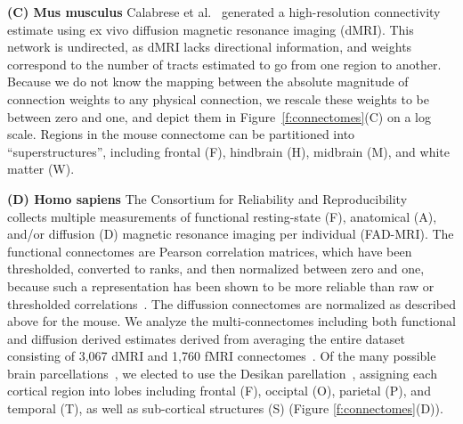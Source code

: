 \documentclass[11pt]{article}
\begin{document}
    \textbf{(C) Mus musculus}
    Calabrese et al.~\cite{Calabrese2015-gw} generated a high-resolution connectivity estimate using ex vivo diffusion magnetic resonance imaging (dMRI).  This network is undirected, as dMRI lacks directional information, and weights correspond to the number of tracts estimated to go from one region to another. Because we do not know the mapping between  the absolute magnitude of  connection weights to any  physical connection, we rescale these weights to be between zero and one, and depict them in Figure~\ref{f:connectomes}(C) on a log scale.
    Regions in the mouse  connectome can  be  partitioned into ``superstructures'', including frontal (F), hindbrain (H), midbrain (M), and white matter (W).
     
    \textbf{(D) Homo sapiens}
    The Consortium for Reliability and Reproducibility~\cite{Zuo2014-sh} collects multiple measurements of functional resting-state (F),  anatomical (A),  and/or diffusion (D) magnetic resonance imaging per individual (FAD-MRI). The  functional connectomes are Pearson correlation matrices, which have been thresholded, converted to ranks, and then normalized between zero and one,  because such a representation has been shown to be more reliable than raw or thresholded correlations~\cite{reliability}.  The diffussion connectomes are normalized as described above for the mouse. 
    We analyze the multi-connectomes including both functional and diffusion derived estimates derived from averaging the entire dataset consisting of 3,067 dMRI and 1,760 fMRI connectomes~\cite{Kiar2018-bo}. 
    Of the many possible brain parcellations~\cite{Glasser2016-ap}, we elected to  use the Desikan parellation~\cite{desikan}, assigning each cortical region into lobes including frontal (F),  occiptal (O), parietal (P), and temporal (T), as well as sub-cortical structures (S)  (Figure \ref{f:connectomes}(D)).
\end{document}
